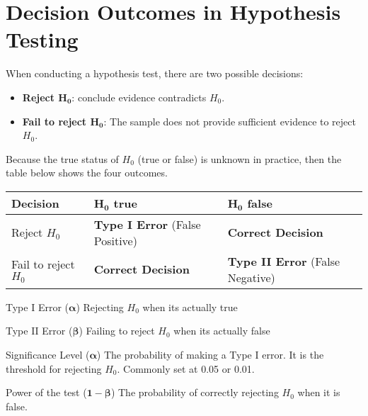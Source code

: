 \documentclass[10pt]{extarticle}
\begin{document}
\section{Decision Outcomes in Hypothesis Testing}
When conducting a hypothesis test, there are two possible decisions:
\begin{itemize}
    \item \textbf{Reject $\boldsymbol{H_0}$}: conclude evidence contradicts $H_0$.
    \item \textbf{Fail to reject $\boldsymbol{H_0}$}: The sample does not provide sufficient evidence to reject $H_0$.
\end{itemize}
\noindent Because the true status of $H_0$ (true or false) is unknown in practice, then the table below shows the four outcomes.
\begin{center}
    \begin{tabularx}{\textwidth}{@{} X X X @{}}
        \toprule
        \textbf{Decision} & \textbf{$\boldsymbol{H_0}$ true} & \textbf{$\boldsymbol{H_0}$ false} \\
        \midrule
        Reject $H_0$ & \textbf{Type I Error} (False Positive) & \textbf{Correct Decision} \\
        \addlinespace[2ex]
        Fail to reject $H_0$ & \textbf{Correct Decision} & \textbf{Type II Error} (False Negative) \\
        \bottomrule
    \end{tabularx}
\end{center}
\begin{definitionbox}{Type I Error ($\boldsymbol{\alpha}$)}{}
    Rejecting $H_0$ when its actually true
\end{definitionbox}
\begin{definitionbox}{Type II Error ($\boldsymbol{\beta}$)}{}
    Failing to reject $H_0$ when its actually false
\end{definitionbox}
\begin{definitionbox}{Significance Level ($\boldsymbol{\alpha}$)}{}
    The probability of making a Type I error. It is the threshold for rejecting $H_0$. Commonly set at 0.05 or 0.01.
\end{definitionbox}
\begin{definitionbox}{Power of the test ($\boldsymbol{1 - \beta}$)}{}
    The probability of correctly rejecting $H_0$ when it is false.
\end{definitionbox}
\end{document}
